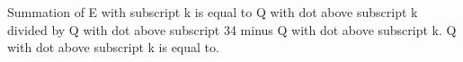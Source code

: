Summation of E with subscript k is equal to Q with dot above subscript k divided by Q with dot above subscript 34 minus Q with dot above subscript k. Q with dot above subscript k is equal to.